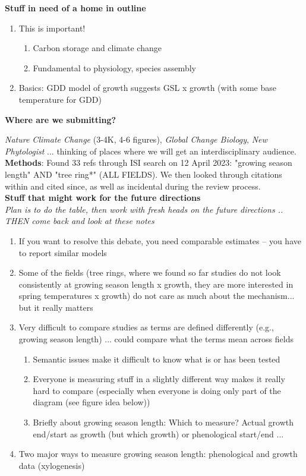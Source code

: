 \documentclass[11pt,letter]{article}
\begin{document}
{\bf Stuff in need of a home in outline} 
\begin{enumerate}
\item This is important! 
\begin{enumerate}
\item Carbon storage and climate change
\item Fundamental to physiology, species assembly
\end{enumerate}
\item Basics: GDD model of growth suggests GSL x growth (with some base temperature for GDD)
\end{enumerate}




{\bf Where are we submitting?}

\emph{Nature Climate Change} (3-4K, 4-6 figures), \emph{Global Change Biology}, \emph{New Phytologist} ... thinking of places where we will get an interdisciplinary audience.\\

{\bf Methods}: Found 33 refs through ISI search on 12 April 2023: "growing season length" AND "tree ring*" (ALL FIELDS). We then looked through citations within and cited since, as well as incidental during the review process.\\

\newpage
{\bf Stuff that might work for the future directions}\\
\emph{Plan is to do the table, then work with fresh heads on the future directions .. THEN come back and look at these notes}
\begin{enumerate}
\item If you want to resolve this debate, you need comparable estimates -- you have to report similar models %
\item Some of the fields (tree rings, where we found so far studies do not look consistently at growing season length x growth, they are more interested in spring temperatures x growth) do not care as much about the mechanism... but it really matters
\item Very difficult to compare studies as terms are defined differently (e.g., growing season length) ... could compare what the terms mean across fields
\begin{enumerate}
\item Semantic issues make it difficult to know what is or has been tested
\item Everyone is measuring stuff in a slightly different way makes it really hard to compare (especially when everyone is doing only part of the diagram (see figure idea below))
\item Briefly about growing season length: Which to measure? Actual growth end/start as growth (but which growth) or phenological start/end ... 
\end{enumerate}
\item Two major ways to measure growing season length: phenological and growth data (xylogenesis)
\end{enumerate}
\end{document}
